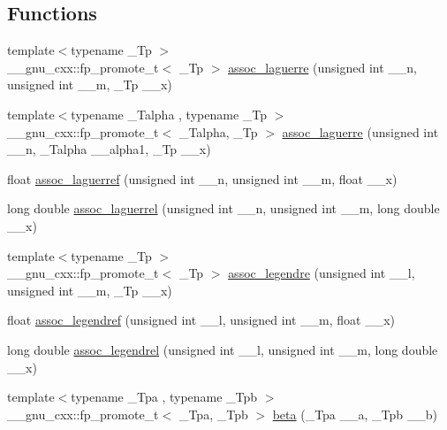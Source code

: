 \subsection*{Functions}
\begin{DoxyCompactItemize}
\item 
{\footnotesize template$<$typename \+\_\+\+Tp $>$ }\\\+\_\+\+\_\+gnu\+\_\+cxx\+::fp\+\_\+promote\+\_\+t$<$ \+\_\+\+Tp $>$ \hyperlink{group__cxx17__math__spec__func_ga0b33e0ac3066f2353861ce2f34b43f57}{assoc\+\_\+laguerre} (unsigned int \+\_\+\+\_\+n, unsigned int \+\_\+\+\_\+m, \+\_\+\+Tp \+\_\+\+\_\+x)
\item 
{\footnotesize template$<$typename \+\_\+\+Talpha , typename \+\_\+\+Tp $>$ }\\\+\_\+\+\_\+gnu\+\_\+cxx\+::fp\+\_\+promote\+\_\+t$<$ \+\_\+\+Talpha, \+\_\+\+Tp $>$ \hyperlink{group__cxx17__math__spec__func_gab135b6cb6154e6eccb7825ae939602db}{assoc\+\_\+laguerre} (unsigned int \+\_\+\+\_\+n, \+\_\+\+Talpha \+\_\+\+\_\+alpha1, \+\_\+\+Tp \+\_\+\+\_\+x)
\item 
float \hyperlink{group__cxx17__math__spec__func_gaf83d98f350a1cfcebee6a1f723cf90d2}{assoc\+\_\+laguerref} (unsigned int \+\_\+\+\_\+n, unsigned int \+\_\+\+\_\+m, float \+\_\+\+\_\+x)
\item 
long double \hyperlink{group__cxx17__math__spec__func_gac8e245671fb2df5de5fd978d03081f6c}{assoc\+\_\+laguerrel} (unsigned int \+\_\+\+\_\+n, unsigned int \+\_\+\+\_\+m, long double \+\_\+\+\_\+x)
\item 
{\footnotesize template$<$typename \+\_\+\+Tp $>$ }\\\+\_\+\+\_\+gnu\+\_\+cxx\+::fp\+\_\+promote\+\_\+t$<$ \+\_\+\+Tp $>$ \hyperlink{group__cxx17__math__spec__func_ga7aa4182446f687094b12688078517d53}{assoc\+\_\+legendre} (unsigned int \+\_\+\+\_\+l, unsigned int \+\_\+\+\_\+m, \+\_\+\+Tp \+\_\+\+\_\+x)
\item 
float \hyperlink{group__cxx17__math__spec__func_ga3ced07ddd24bf4af56e2712d148e7f57}{assoc\+\_\+legendref} (unsigned int \+\_\+\+\_\+l, unsigned int \+\_\+\+\_\+m, float \+\_\+\+\_\+x)
\item 
long double \hyperlink{group__cxx17__math__spec__func_ga55977b425a539146f060dec1c8003344}{assoc\+\_\+legendrel} (unsigned int \+\_\+\+\_\+l, unsigned int \+\_\+\+\_\+m, long double \+\_\+\+\_\+x)
\item 
{\footnotesize template$<$typename \+\_\+\+Tpa , typename \+\_\+\+Tpb $>$ }\\\+\_\+\+\_\+gnu\+\_\+cxx\+::fp\+\_\+promote\+\_\+t$<$ \+\_\+\+Tpa, \+\_\+\+Tpb $>$ \hyperlink{group__cxx17__math__spec__func_gacd36403ae64b89840b1504f97024dcee}{beta} (\+\_\+\+Tpa \+\_\+\+\_\+a, \+\_\+\+Tpb \+\_\+\+\_\+b)

\end{DoxyCompactItemize}
